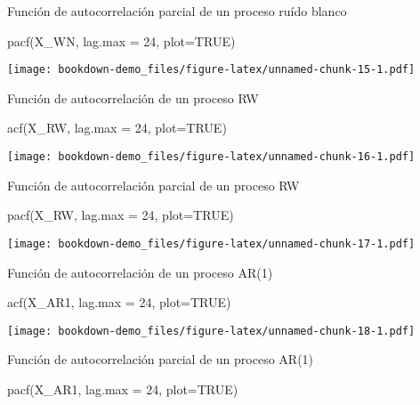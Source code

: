 \documentclass[
]{book}
\newenvironment{Shaded}{\begin{snugshade}}{\end{snugshade}}
\newcommand{\AttributeTok}[1]{\textcolor[rgb]{0.77,0.63,0.00}{#1}}
\newcommand{\ConstantTok}[1]{\textcolor[rgb]{0.00,0.00,0.00}{#1}}
\newcommand{\DecValTok}[1]{\textcolor[rgb]{0.00,0.00,0.81}{#1}}
\newcommand{\FunctionTok}[1]{\textcolor[rgb]{0.00,0.00,0.00}{#1}}
\newcommand{\NormalTok}[1]{#1}
\begin{document}
Función de autocorrelación parcial de un proceso ruído blanco

\begin{Shaded}
\begin{Highlighting}[]
\FunctionTok{pacf}\NormalTok{(X\_WN, }\AttributeTok{lag.max =} \DecValTok{24}\NormalTok{, }\AttributeTok{plot=}\ConstantTok{TRUE}\NormalTok{)}
\end{Highlighting}
\end{Shaded}

\texttt{[image: bookdown-demo\_files/figure-latex/unnamed-chunk-15-1.pdf]}

Función de autocorrelación de un proceso RW

\begin{Shaded}
\begin{Highlighting}[]
\FunctionTok{acf}\NormalTok{(X\_RW, }\AttributeTok{lag.max =} \DecValTok{24}\NormalTok{, }\AttributeTok{plot=}\ConstantTok{TRUE}\NormalTok{)}
\end{Highlighting}
\end{Shaded}

\texttt{[image: bookdown-demo\_files/figure-latex/unnamed-chunk-16-1.pdf]}

Función de autocorrelación parcial de un proceso RW

\begin{Shaded}
\begin{Highlighting}[]
\FunctionTok{pacf}\NormalTok{(X\_RW, }\AttributeTok{lag.max =} \DecValTok{24}\NormalTok{, }\AttributeTok{plot=}\ConstantTok{TRUE}\NormalTok{)}
\end{Highlighting}
\end{Shaded}

\texttt{[image: bookdown-demo\_files/figure-latex/unnamed-chunk-17-1.pdf]}

Función de autocorrelación de un proceso AR(1)

\begin{Shaded}
\begin{Highlighting}[]
\FunctionTok{acf}\NormalTok{(X\_AR1, }\AttributeTok{lag.max =} \DecValTok{24}\NormalTok{, }\AttributeTok{plot=}\ConstantTok{TRUE}\NormalTok{)}
\end{Highlighting}
\end{Shaded}

\texttt{[image: bookdown-demo\_files/figure-latex/unnamed-chunk-18-1.pdf]}

Función de autocorrelación parcial de un proceso AR(1)

\begin{Shaded}
\begin{Highlighting}[]
\FunctionTok{pacf}\NormalTok{(X\_AR1, }\AttributeTok{lag.max =} \DecValTok{24}\NormalTok{, }\AttributeTok{plot=}\ConstantTok{TRUE}\NormalTok{)}
\end{Highlighting}
\end{Shaded}
\end{document}

